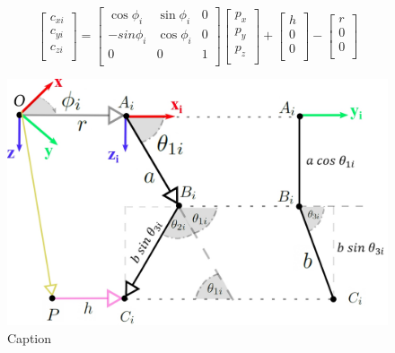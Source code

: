         \begin{equation}
                    \left[ \begin{matrix}
                    c_{xi}\\
                    c_{yi}\\
                    c_{zi}\\
                    \end{matrix}
                     \right] = \left[ \begin{matrix}
                    \cos  \phi _{i}  &  \sin  \phi _{i}  &  0\\
                    -sin \phi _{i}  &  \cos  \phi _{i}  &  0\\
                    0  &  0  &  1\\
                    \end{matrix}
                     \right]  \left[ \begin{matrix}
                    p_{x}\\
                    p_{y}\\
                    p_{z}\\
                    \end{matrix}
                     \right] +  \left[ \begin{matrix}
                    h\\
                    0\\
                    0\\
                    \end{matrix}
                     \right] - \left[ \begin{matrix}
                    r\\
                    0\\
                    0\\
                    \end{matrix}
                     \right] 
                \label{eq:modelacion_cine_vel_metodoa_anexo_3}
        \end{equation}

        \begin{figure}[htb]
            \centering
            \includegraphics[width=0.9\linewidth]{Main/Chapter4/Images4/DIBUJO22.jpg}
            \caption{Caption}
            \label{fig:ANEXO_MA_C_vel_1}
        \end{figure}
     
